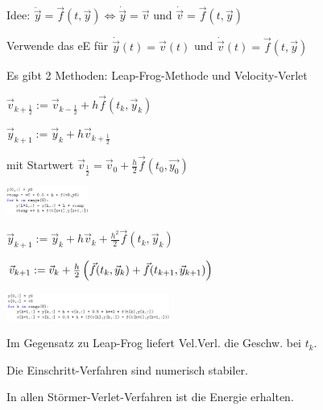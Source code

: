 \vspace{1\baselineskip}


Idee: $\ddot{\vec{y}} = \vec{f}(t,\vec{y}) \Leftrightarrow \dot{\vec{y}} = \vec{v}$ und
$\dot{\vec{v}} = \vec{f}(t,\vec{y})$

Verwende das eE für $\dot{\vec{y}}(t) = \vec{v}(t)$ und
$\dot{\vec{v}}(t) = \vec{f}(t,\vec{y})$

Es gibt 2 Methoden: Leap-Frog-Methode und Velocity-Verlet

\vspace{1\baselineskip}


$\vec{v}_{k+\frac{1}{2}} := \vec{v}_{k-\frac{1}{2}} + h \vec{f}(t_k,\vec{y}_k)$

$\vec{y}_{k+1} := \vec{y}_k + h \vec{v}_{k+\frac{1}{2}}$

mit Startwert $\vec{v}_{\frac{1}{2}} = \vec{v}_0 + \frac{h}{2} \vec{f}(t_0,\vec{y_0})$

\begin{center}
    \includegraphics[width=0.2\textwidth]{Figures/ESF.png}
\end{center}

\vspace{1\baselineskip}


$\vec{y}_{k+1} := \vec{y}_k + h \vec{v}_k + \frac{h^2}{2} \vec{f}(t_k,\vec{y}_k)$

$\vec{v}_{k+1} := \vec{v}_k + \frac{h}{2} \left( \vec{f}(t_k,\vec{y}_k) + \vec{f}(t_{k+1},\vec{y}_{k+1}) \right)$

\begin{center}
    \includegraphics[width=0.4\textwidth]{Figures/VV.png}
\end{center}

Im Gegensatz zu Leap-Frog liefert Vel.Verl. die Geschw. bei $t_k$.

\vspace{1\baselineskip}

Die Einschritt-Verfahren sind numerisch stabiler.

In allen Störmer-Verlet-Verfahren ist die Energie erhalten.

